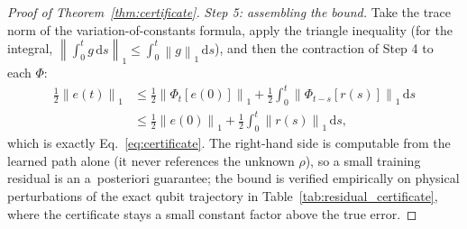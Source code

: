 \documentclass[twocolumn,aps,prxquantum,superscriptaddress,nofootinbib,floatfix,longbibliography]{revtex4-2}
\newcommand{\dd}{\mathrm{d}}
\newcommand{\norm}[1]{\left\lVert #1 \right\rVert}
\begin{document}
\begin{proof}[Proof of Theorem~\ref{thm:certificate}]
\emph{Step 5: assembling the bound.} Take the trace norm of the variation-of-constants formula, apply the triangle inequality (for the integral, $\norm{\int_0^t g\,\dd s}_1\le\int_0^t\norm{g}_1\,\dd s$), and then the contraction of Step 4 to each $\Phi$:
\begin{equation*}
\begin{aligned}
\tfrac12\norm{e(t)}_1&\le\tfrac12\norm{\Phi_t[e(0)]}_1+\tfrac12\int_0^t\norm{\Phi_{t-s}[r(s)]}_1\,\dd s\\
&\le\tfrac12\norm{e(0)}_1+\tfrac12\int_0^t\norm{r(s)}_1\,\dd s,
\end{aligned}
\end{equation*}
which is exactly Eq.~\eqref{eq:certificate}. The right-hand side is computable from the learned path alone (it never references the unknown $\rho$), so a small training residual is an a~posteriori guarantee; the bound is verified empirically on physical perturbations of the exact qubit trajectory in Table~\ref{tab:residual_certificate}, where the certificate stays a small constant factor above the true error.
\end{proof}
\end{document}
